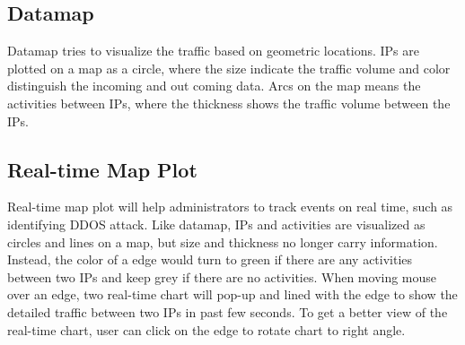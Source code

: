 \subsection{Datamap}
Datamap tries to visualize the traffic based on geometric locations. IPs are plotted on a map as a circle, where the size indicate the traffic volume and color distinguish the incoming and out coming data. Arcs on the map means the activities between IPs, where the thickness shows the traffic volume between the IPs.

\subsection{Real-time Map Plot}
Real-time map plot will help administrators to track events on real time, such as identifying DDOS attack. Like datamap, IPs and activities are visualized as circles and lines on a map, but size and thickness no longer carry information. Instead, the color of a edge would turn to green if there are any activities between two IPs and keep grey if there are no activities. When moving mouse over an edge, two real-time chart will pop-up and lined with the edge to show the detailed traffic between two IPs in past few seconds. To get a better view of the real-time chart, user can click on the edge to rotate chart to right angle.
